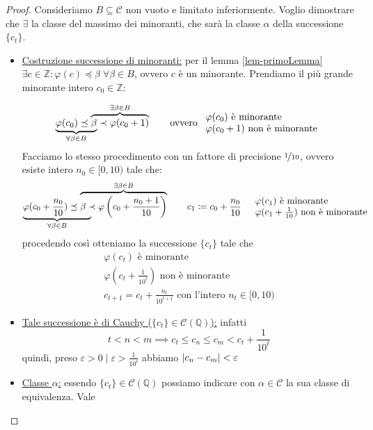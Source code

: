 \documentclass[a4paper,10pt]{article}
\theoremstyle{definition}
\newcommand{\za}{\mathbb{Z}} %
\newcommand{\qu}{\mathbb{Q}} %
\theoremstyle{indentdefinition}
\theoremstyle{indentpostulate}
\theoremstyle{indenttheorem}
\theoremstyle{myremark}
\theoremstyle{indentgeneral}
\begin{document}
\begin{proof}
    Consideriamo $B\subseteq\mathscr{C}$ non vuoto e limitato inferiormente. Voglio dimostrare che $\exists$ la classe del massimo dei minoranti, che sarà la classe $\alpha$ della successione $\{c_t\}$.
    \begin{itemize}
        \item \underline{Costruzione successione di minoranti:} per il lemma \ref{lem-primoLemma} $\exists c \in\za :\varphi(c)\preceq \beta \;\forall \beta\in B$, ovvero $c$ è un minorante. Prendiamo il più grande minorante intero $c_0\in\za$:

        $$\lefteqn{\underbrace{\phantom{\varphi(c_0)\preceq \beta}}_{\forall\beta\in B}}\varphi(c_0)\preceq \overbrace{\beta\prec\varphi(c_0+1)}^{\exists \beta\in B}\qquad\text{ovvero }\begin{array}{l}
             \varphi(c_0) \text{ è minorante}  \\
             \varphi(c_0+1) \text{ non è minorante}
        \end{array}$$
        Facciamo lo stesso procedimento con un fattore di precisione $\nicefrac{1}{10}$, ovvero esiste intero $n_0\in[0,10)$ tale che:
         $$\lefteqn{\underbrace{\phantom{\varphi\left(c_0+\frac{n_0}{10}\right)\preceq \beta}}_{\forall\beta\in B}}\varphi(c_0+\frac{n_0}{10})\preceq \overbrace{\beta\prec\varphi\left(c_0+\frac{n_0+1}{10}\right)}^{\exists \beta\in B}\qquad c_1\coloneqq c_0+\frac{n_0}{10} \quad \begin{array}{l}
             \varphi(c_1) \text{ è minorante}  \\
             \varphi(c_1+\frac{1}{10}) \text{ non è minorante}
        \end{array}$$
        procedendo così otteniamo la successione $\{c_t\}$ tale che
        $$\begin{array}{l}
             \varphi(c_t) \text{ è minorante}  \\
             \varphi(c_t+\frac{1}{10^t}) \text{ non è minorante}\\
             c_{t+1}=c_t+\frac{n_t}{10^{t+1}}\text{ con l'intero }n_t\in[0,10)
        \end{array}$$
        \item \underline{Tale successione è di Cauchy ($\{c_t\}\in\mathscr{C}(\qu)$):} infatti
        $$t<n<m\implies c_t\le c_n\le c_m <c_t+\frac{1}{10^t}$$
        quindi, preso $\varepsilon>0\mid\varepsilon>\frac{1}{10^t}$ abbiamo $\abs{c_n-c_m}<\varepsilon$
        \item \underline{Classe $\alpha$:} essendo $\{c_t\}\in\mathscr{C}(\qu)$ possiamo indicare con $\alpha\in\mathscr{C}$ la sua classe di equivalenza. Vale

\end{itemize}
\end{proof}
\end{document}
